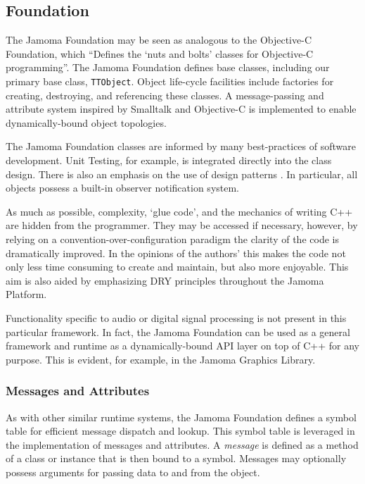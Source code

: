 \documentclass[twoside,10pt]{article}
\begin{document}
\subsection{Foundation} %

The Jamoma Foundation \cite{web7} may be seen as analogous to the Objective-C Foundation, which ``Defines the `nuts and bolts' classes for Objective-C programming''\cite{web8}.  The Jamoma Foundation defines base classes, including our primary base class, \texttt{TTObject}.  Object life-cycle facilities include factories for creating, destroying, and referencing these classes.  A message-passing and attribute system inspired by Smalltalk and Objective-C is implemented to enable dynamically-bound object topologies.  

The Jamoma Foundation classes are informed by many best-practices of software development.  Unit Testing, for example, is integrated directly into the class design.  There is also an emphasis on the use of design patterns \cite{Gamma:1995}.  In particular, all objects possess a built-in observer notification system.  

As much as possible, complexity, `glue code', and the mechanics of writing C++ are hidden from the programmer.  They may be accessed if necessary, however, by relying on a convention-over-configuration paradigm the clarity of the code is dramatically improved.  In the opinions of the authors' this makes the code not only less time consuming to create and maintain, but also more enjoyable.  This aim is also aided by emphasizing DRY principles throughout the Jamoma Platform.

Functionality specific to audio or digital signal processing is not present in this particular framework.  In fact, the Jamoma Foundation can be used as a general framework and runtime as a dynamically-bound API layer on top of C++ for any purpose.  This is evident, for example, in the Jamoma Graphics Library.

\subsubsection{Messages and Attributes} %

As with other similar runtime systems, the Jamoma Foundation defines a symbol table for efficient message dispatch and lookup.  This symbol table is leveraged in the implementation of messages and attributes.  
A \emph{message} is defined as a method of a class or instance that is then bound to a symbol.  Messages may optionally possess arguments for passing data to and from the object.
\end{document}
